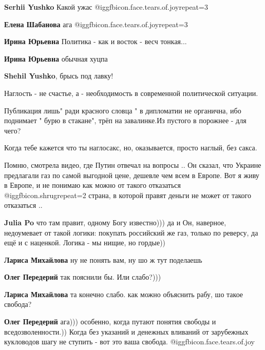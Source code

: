 \begin{itemize}
\begin{itemize}
\textbf{Serhii Yushko} Какой ужас @igg{fbicon.face.tears.of.joy}{repeat=3} 

\textbf{Елена Шабанова} ага @igg{fbicon.face.tears.of.joy}{repeat=3} 

\textbf{Ирина Юрьевна} Политика - как и восток - весч тонкая...

\textbf{Ирина Юрьевна} обычная хуцпа

\textbf{Shehil Yushko}, брысь под лавку!

Наглость - не счастье, а - необходимость в современной политической ситуации.
\end{itemize} %


Публикация лишь" ради красного словца " в дипломатии не органична, ибо
поднимает " бурю в стакане", трёп на завалинке.Из пустого в порожнее - для
чего?

Когда тебе кажется что ты наглосакс, но, оказывается, просто наглый, без сакса.


Помню, смотрела видео, где Путин отвечал на вопросы .. Он сказал, что Украине
предлагали газ по самой выгодной цене, дешевле чем всем в Европе. Вот я живу в
Европе, и не понимаю как можно от такого отказаться  @igg{fbicon.shrug}{repeat=2}  страна, в которой
правят деньги не может от такого отказаться ..

\begin{itemize} %
\textbf{Julia Po} что там правит, одному Богу известно))) да и Он, наверное, недоумевает от такой логики: покупать российский же газ, только по реверсу, да ещё и с наценкой. Логика - мы нищие, но гордые))

\textbf{Лариса Михайлова} ну не понять вам, ну шо ж тут поделаешь

\textbf{Олег Передерий} так пояснили бы. Или слабо?)))

\textbf{Лариса Михайлова} та конечно слабо. как можно объяснить рабу, шо такое свобода?

\textbf{Олег Передерий} ага))) особенно, когда путают понятия свободы и вседозволенности.)) Когда без указаний и денежных вливаний от зарубежных кукловодов шагу не ступить - вот это ваша свобода.  @igg{fbicon.face.tears.of.joy} 


\end{itemize}
\end{itemize}
